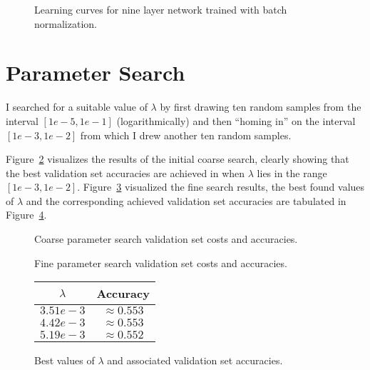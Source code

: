 \documentclass{article}
\begin{document}
\begin{figure}[H]
  \centering
    
  \caption{Learning curves for nine layer network trained with batch
           normalization.}
  \label{fig:nine_layers_bn}
\end{figure}

\section{Parameter Search}

I searched for a suitable value of $\lambda$ by first drawing ten random samples
from the interval $[1e-5, 1e-1]$ (logarithmically) and then ``homing in'' on
the interval $[1e-3, 1e-2]$ from which I drew another ten random samples.

Figure~\ref{fig:coarse_search} visualizes the results of the initial coarse
search, clearly showing that the best validation set accuracies are achieved
in when $\lambda$ lies in the range $[1e-3, 1e-2]$. Figure~\ref{fig:fine_search}
visualized the fine search results, the best found values of $\lambda$ and
the corresponding achieved validation set accuracies are tabulated in
Figure~\ref{fig:best_lambda}.

\begin{figure}[H]
  \centering
    
  \caption{Coarse parameter search validation set costs and accuracies.}
  \label{fig:coarse_search}
\end{figure}

\begin{figure}[H]
  \centering
    
  \caption{Fine parameter search validation set costs and accuracies.}
  \label{fig:fine_search}
\end{figure}

\begin{figure}[H]
  \centering
    \begin{tabular}{|c|c|}
    \hline
    $\lambda$ & Accuracy        \\
    \hline
    $3.51e-3$ & $\approx 0.553$ \\
    \hline
    $4.42e-3$ & $\approx 0.553$ \\
    \hline
    $5.19e-3$ & $\approx 0.552$ \\
    \hline
    \end{tabular}
  \caption{Best values of $\lambda$ and associated validation set accuracies.}
  \label{fig:best_lambda}
\end{figure}
\end{document}
